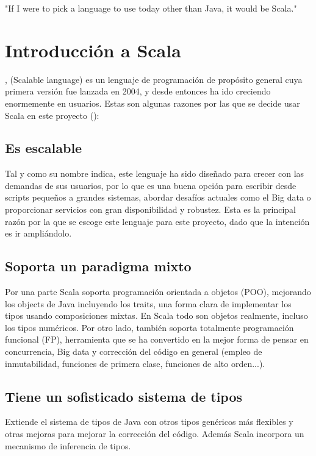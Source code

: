 
\begin{savequote}[75mm]
	"If I were to pick a language to use today other than Java, it would be Scala."
\end{savequote}

\chapter{Introducción a Scala}
, (Scalable language) es un lenguaje de programación de propósito general cuya primera versión fue lanzada en 2004, y desde entonces ha ido creciendo enormemente en usuarios. Estas son algunas razones por las que se decide usar Scala en este proyecto (\citet{9781491949856}):
\section*{Es escalable} Tal y como su nombre indica, este lenguaje ha sido diseñado para crecer con las demandas de sus usuarios, por lo que es una buena opción para escribir desde scripts pequeños a grandes sistemas, abordar desafíos actuales como el Big data o proporcionar servicios con gran disponibilidad y robustez. Esta es la principal razón por la que se escoge este lenguaje para este proyecto, dado que la intención es ir ampliándolo.

\section*{Soporta un paradigma mixto} Por una parte \textsf{Scala} soporta programación orientada a objetos (POO), mejorando los objects de Java incluyendo los \textsf{traits}, una forma clara de implementar los tipos usando composiciones mixtas. En \textsf{Scala} todo son objetos realmente, incluso los tipos numéricos. Por otro lado, también soporta totalmente programación funcional (FP),
herramienta que se ha convertido en la mejor forma de pensar en concurrencia, Big data y corrección del código en general (empleo de inmutabilidad, funciones de primera clase, funciones de alto orden...). 

\section*{Tiene un sofisticado sistema de tipos} Extiende el sistema de tipos de Java con otros tipos genéricos más flexibles y otras mejoras para mejorar la corrección del código. Además \textsf{Scala} incorpora un mecanismo de inferencia de tipos.

